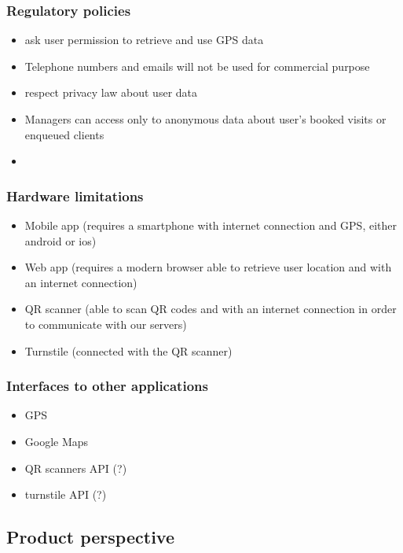 \subsubsection{Regulatory policies}
\label{subsubsect:regulatorypolicies}

\begin{itemize}
    \item ask user permission to retrieve and use GPS data
    \item Telephone numbers and emails will not be used for commercial purpose
    \item respect privacy law about user data
    \item Managers can access only to anonymous data about user's booked visits or enqueued clients
    \item 
\end{itemize}

\subsubsection{Hardware limitations}
\label{subsubsect:hardwarelimitations}

\begin{itemize}
    \item Mobile app (requires a smartphone with internet connection and GPS, either android or ios)
    \item Web app (requires a modern browser able to retrieve user location and with an internet connection)
    \item QR scanner (able to scan QR codes and with an internet connection in order to communicate with our servers)
    \item Turnstile (connected with the QR scanner)
\end{itemize}


\subsubsection{Interfaces to other applications}
\label{subsubsect:interfacestootherappications}

\begin{itemize}
    \item GPS
    \item Google Maps
    \item QR scanners API (?)
    \item turnstile API (?)
\end{itemize}

\subsection{Product perspective}
\label{subsect:productperspective}

